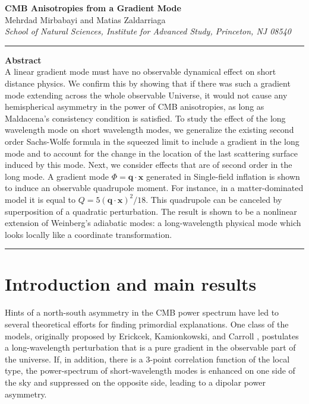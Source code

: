 \documentclass[12pt]{article}
\numberwithin{equation}{section}
\def\bsb{\boldsymbol}
\def\x{{\bsb x}}
\def\q{{\bsb q}}
\begin{document}
\vspace*{0.cm}
\begin{center}

{\LARGE\bf    CMB Anisotropies from a Gradient Mode}
\\[1.5 cm]
{\large Mehrdad Mirbabayi} and {\large Matias Zaldarriaga}
\\[0.7cm]

{\normalsize { \sl  School of Natural Sciences, Institute for Advanced Study, Princeton, NJ 08540}}\\
\vspace{.2cm}

\end{center}

\vspace{.8cm}


\hrule \vspace{0.3cm}
{\small  \noindent \textbf{Abstract} \\[0.3cm]
\noindent A linear gradient mode must have no observable dynamical effect on short distance physics. We confirm this by showing that if there was such a gradient mode extending across the whole observable Universe, it would not cause any hemispherical asymmetry in the power of CMB anisotropies, as long as Maldacena's consistency condition is satisfied. To study the effect of the long wavelength mode on short wavelength modes, we generalize the existing second order Sachs-Wolfe formula in the squeezed limit to include a gradient in the long mode and to account for the change in the location of the last scattering surface induced by this mode. Next, we consider effects that are of second order in the long mode. A gradient mode $\Phi = \q\cdot \x$ generated in Single-field inflation is shown to induce an observable quadrupole moment. For instance, in a matter-dominated model it is equal to $Q=5 (\q\cdot\x)^2 /18$. This quadrupole can be canceled by superposition of a quadratic perturbation. The result is shown to be a nonlinear extension of Weinberg's adiabatic modes: a long-wavelength physical mode which looks locally like a coordinate transformation. }

 \vspace{0.3cm}
\hrule

\section{Introduction and main results}

Hints of a north-south asymmetry in the CMB power spectrum \cite{Wmap,Planck,Akrami,Quartin} have led to several theoretical efforts for finding primordial explanations. One class of the models, originally proposed by Erickcek, Kamionkowski, and Carroll \cite{Erickcek}, postulates a long-wavelength perturbation that is a pure gradient in the observable part of the universe. If, in addition, there is a 3-point correlation function of the local type, the power-spectrum of short-wavelength modes is enhanced on one side of the sky and suppressed on the opposite side, leading to a dipolar power asymmetry. 
\end{document}
